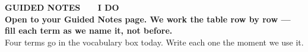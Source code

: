 \documentclass[aspectratio=169, 11pt]{beamer}
\begin{document}
{
\begin{frame}[plain]
  \vspace{1.8cm}\hspace{0.8cm}%
  \begin{minipage}{0.86\textwidth}
    {\color{goldacc}\bfseries\small GUIDED NOTES \ \textbullet\ \ I DO}\\[0.7cm]
    {\color{white}\bfseries\Large Open to your Guided Notes page. We work the table row by
    row --- fill each term as we name it, not before.}\\[0.9cm]
    {\color{frostmid}\small Four terms go in the vocabulary box today. Write each one the
    moment we use it.}
  \end{minipage}
\end{frame}
}
\end{document}
